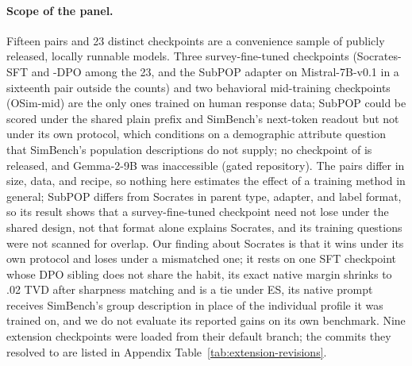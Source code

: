 \documentclass[11pt]{article}
\newcommand{\ES}{\textsc{ES}}
\begin{document}
\paragraph{Scope of the panel.}
Fifteen pairs and 23 distinct checkpoints are a convenience sample of publicly
released, locally runnable models. Three survey-fine-tuned checkpoints (Socrates-SFT and -DPO among the 23, and the SubPOP adapter on Mistral-7B-v0.1 in a sixteenth pair outside the counts) and two
behavioral mid-training checkpoints (OSim-mid) are the only ones trained on
human response data; SubPOP could be scored under the shared plain prefix
and SimBench's next-token readout but not under its own protocol, which
conditions on a demographic attribute question that SimBench's population
descriptions do not supply; no checkpoint of
\citet{cao-etal-2025-specializing} is released, and Gemma-2-9B was
inaccessible (gated repository). The pairs differ
in size, data, and recipe, so nothing here estimates the effect of a training
method in general; SubPOP differs from Socrates in parent type, adapter, and
label format, so its result shows that a survey-fine-tuned checkpoint need
not lose under the shared design, not that format alone explains Socrates,
and its training questions were not scanned for overlap. Our finding about Socrates is that it wins under its own
protocol and loses under a mismatched one; it rests on one SFT checkpoint
whose DPO sibling does not share the habit, its exact native margin shrinks
to .02 TVD after sharpness matching and is a tie under \ES{}, its native
prompt receives SimBench's group description in place of the individual
profile it was trained on, and we do not evaluate its reported gains on its
own benchmark. Nine extension checkpoints were loaded from their default
branch; the commits they resolved to are listed in Appendix
Table~\ref{tab:extension-revisions}.
\end{document}
